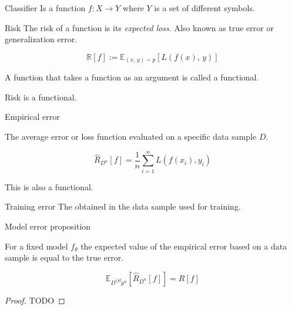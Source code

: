 \begin{definition}{Classifier}{}
	Is a function \(f: X \longrightarrow Y\)
	where \(Y\) is a set of different symbols.
\end{definition}

\begin{definition}{Risk}{}
	The risk of a function is its \emph{expected loss}. Also known as true
	error or generalization error.

	\begin{equation*}
		\mathds{R}[f] := \mathds{E}_{(x,\, y) \sim p} \left[ L(f(x),\, y) \right]
	\end{equation*}

	\begin{note}
		A function that takes a function as an argument is called a functional.

    Risk is a functional. 
	\end{note}
\end{definition}

\begin{definition}{Empirical error}{}

	The average error or loss function evaluated on a specific data sample
	\(D\).

	\begin{equation*}
		\hat{R}_{D^n}[f] = \frac{1}{n} \sum_{i=1}^n L(f(x_i), y_i)
	\end{equation*}

	\begin{note}
		This is also a functional.
	\end{note}
\end{definition}

\begin{definition}{Training error}{}
	The  obtained in the data
	sample used for training.
\end{definition}

\begin{prop}{Model error proposition}{}

	For a fixed model \(f_θ\) the expected value of the
	empirical error based on a data sample is equal to the true error.

	\begin{equation*}
		\mathds{E}_{D^{ijd}p^n}[\hat{R}_{D^n}[f]] = R[f]
	\end{equation*}

	\begin{proof} TODO
	\end{proof}
\end{prop}


